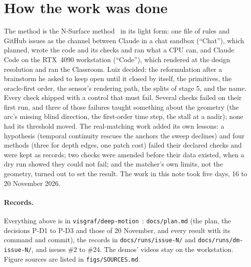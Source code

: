 \documentclass[11pt,a4paper]{article}
\newcommand{\code}[1]{\texttt{\small #1}}
\begin{document}
\section{How the work was done}\label{sec:process}

The method is the N-Surface method~\cite{nsurface} in its light form: one file of rules and GitHub issues as the channel
between Claude in a chat sandbox (``Chat''), which planned, wrote the code and its checks and ran what a CPU can, and
Claude Code on the RTX~4090 workstation (``Code''), which rendered at the design resolution and ran the Classroom. Luiz
decided: the reformulation after a brainstorm he asked to keep open until it closed by itself, the primitives, the
oracle-first order, the sensor's rendering path, the splits of stage 5, and the name. Every check shipped with a control
that must fail. Several checks failed on their first run, and three of those failures taught something about the
geometry (the arc's missing blind direction, the first-order time step, the stall at a nadir); none had its threshold
moved. The real-matching work added its own lessons: a hypothesis (temporal continuity rescues the anchors the sweep
declines) and four methods (three for depth edges, one patch cost) failed their declared checks and were kept as records;
two checks were amended before their data existed, when a dry run showed they could not fail; and the matcher's own
limits, not the geometry, turned out to set the result. The work in this note took five days, 16 to 20 November 2026.

\paragraph{Records.} Everything above is in \code{visgraf/deep-motion}~\cite{dm}: \code{docs/plan.md} (the plan, the
decisions P-D1 to P-D3 and those of 20 November, and every result with its command and commit), the records in
\code{docs/runs/issue-N/} and \code{docs/runs/dm-issue-N/}, and issues \#2 to \#24. The demos' videos stay on the
workstation. Figure sources are listed in \code{figs/SOURCES.md}.
\end{document}
